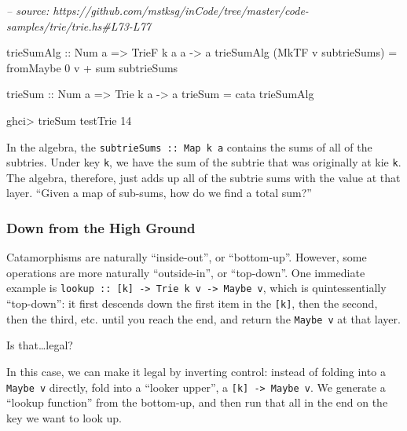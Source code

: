 \documentclass[]{article}
\newenvironment{Shaded}{}{}
\newcommand{\CommentTok}[1]{\textcolor[rgb]{0.38,0.63,0.69}{\textit{#1}}}
\newcommand{\DataTypeTok}[1]{\textcolor[rgb]{0.56,0.13,0.00}{#1}}
\newcommand{\DecValTok}[1]{\textcolor[rgb]{0.25,0.63,0.44}{#1}}
\newcommand{\FunctionTok}[1]{\textcolor[rgb]{0.02,0.16,0.49}{#1}}
\newcommand{\NormalTok}[1]{#1}
\newcommand{\OtherTok}[1]{\textcolor[rgb]{0.00,0.44,0.13}{#1}}
\begin{document}
\begin{Shaded}
\begin{Highlighting}[]
\CommentTok{-- source: https://github.com/mstksg/inCode/tree/master/code-samples/trie/trie.hs#L73-L77}

\OtherTok{trieSumAlg ::} \DataTypeTok{Num}\NormalTok{ a }\OtherTok{=>} \DataTypeTok{TrieF}\NormalTok{ k a a }\OtherTok{->}\NormalTok{ a}
\NormalTok{trieSumAlg (}\DataTypeTok{MkTF}\NormalTok{ v subtrieSums) }\FunctionTok{=}\NormalTok{ fromMaybe }\DecValTok{0}\NormalTok{ v }\FunctionTok{+} \FunctionTok{sum}\NormalTok{ subtrieSums}

\OtherTok{trieSum ::} \DataTypeTok{Num}\NormalTok{ a }\OtherTok{=>} \DataTypeTok{Trie}\NormalTok{ k a }\OtherTok{->}\NormalTok{ a}
\NormalTok{trieSum }\FunctionTok{=}\NormalTok{ cata trieSumAlg}
\end{Highlighting}
\end{Shaded}

\begin{Shaded}
\begin{Highlighting}[]
\NormalTok{ghci}\FunctionTok{>}\NormalTok{ trieSum testTrie}
\DecValTok{14}
\end{Highlighting}
\end{Shaded}

In the algebra, the \texttt{subtrieSums\ ::\ Map\ k\ a} contains the sums of all
of the subtries. Under key \texttt{k}, we have the sum of the subtrie that was
originally at kie \texttt{k}. The algebra, therefore, just adds up all of the
subtrie sums with the value at that layer. ``Given a map of sub-sums, how do we
find a total sum?''

\hypertarget{down-from-the-high-ground}{%
\subsubsection{Down from the High Ground}\label{down-from-the-high-ground}}

Catamorphisms are naturally ``inside-out'', or ``bottom-up''. However, some
operations are more naturally ``outside-in'', or ``top-down''. One immediate
example is
\texttt{lookup\ ::\ {[}k{]}\ -\textgreater{}\ Trie\ k\ v\ -\textgreater{}\ Maybe\ v},
which is quintessentially ``top-down'': it first descends down the first item in
the \texttt{{[}k{]}}, then the second, then the third, etc. until you reach the
end, and return the \texttt{Maybe\ v} at that layer.

Is that\ldots{}legal?

In this case, we can make it legal by inverting control: instead of folding into
a \texttt{Maybe\ v} directly, fold into a ``looker upper'', a
\texttt{{[}k{]}\ -\textgreater{}\ Maybe\ v}. We generate a ``lookup function''
from the bottom-up, and then run that all in the end on the key we want to look
up.
\end{document}
